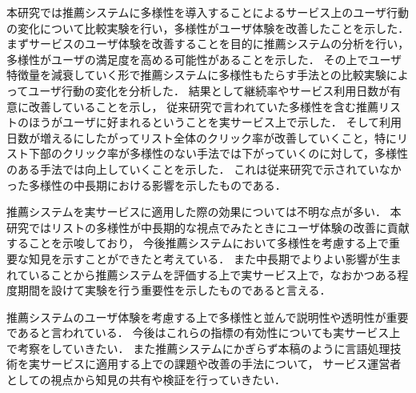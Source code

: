 \documentclass[japanese]{jnlp_1.4}
\begin{document}
本研究では推薦システムに多様性を導入することによるサービス上のユーザ行動の変化について比較実験を行い，多様性がユーザ体験を改善したことを示した．
まずサービスのユーザ体験を改善することを目的に推薦システムの分析を行い，
多様性がユーザの満足度を高める可能性があることを示した．
その上でユーザ特徴量を減衰していく形で推薦システムに多様性もたらす手法との比較実験によってユーザ行動の変化を分析した．
結果として継続率やサービス利用日数が有意に改善していることを示し，
従来研究で言われていた多様性を含む推薦リストのほうがユーザに好まれるということを実サービス上で示した．
そして利用日数が増えるにしたがってリスト全体のクリック率が改善していくこと，特にリスト下部のクリック率が多様性のない手法では下がっていくのに対して，多様性のある手法では向上していくことを示した．
これは従来研究で示されていなかった多様性の中長期における影響を示したものである．

推薦システムを実サービスに適用した際の効果については不明な点が多い．
本研究ではリストの多様性が中長期的な視点でみたときにユーザ体験の改善に貢献することを示唆しており，
今後推薦システムにおいて多様性を考慮する上で重要な知見を示すことができたと考えている．
また中長期でよりよい影響が生まれていることから推薦システムを評価する上で実サービス上で，なおかつある程度期間を設けて実験を行う重要性を示したものであると言える．

推薦システムのユーザ体験を考慮する上で多様性と並んで説明性や透明性が重要であると言われている\cite{Konstan2012}．
今後はこれらの指標の有効性についても実サービス上で考察をしていきたい．
また推薦システムにかぎらず本稿のように言語処理技術を実サービスに適用する上での課題や改善の手法について，
サービス運営者としての視点から知見の共有や検証を行っていきたい．
\end{document}
